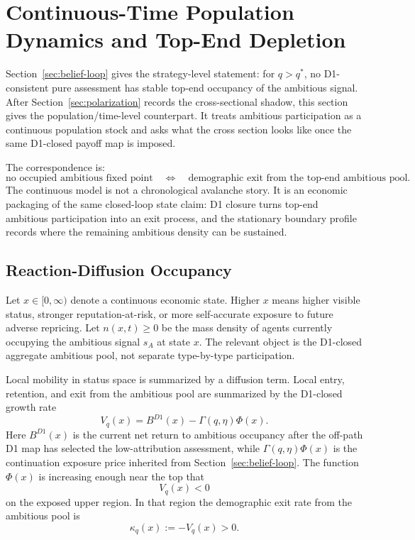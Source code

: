 
\section{Continuous-Time Population Dynamics and Top-End Depletion}
\label{sec:continuous-phase-transition}

Section~\ref{sec:belief-loop} gives the strategy-level statement: for \(q>q^*\), no D1-consistent pure assessment has stable top-end occupancy of the ambitious signal. After Section~\ref{sec:polarization} records the cross-sectional shadow, this section gives the population/time-level counterpart. It treats ambitious participation as a continuous population stock and asks what the cross section looks like once the same D1-closed payoff map is imposed.

The correspondence is:
\[
\text{no occupied ambitious fixed point}
\quad\Longleftrightarrow\quad
\text{demographic exit from the top-end ambitious pool}.
\]
The continuous model is not a chronological avalanche story. It is an economic packaging of the same closed-loop state claim: D1 closure turns top-end ambitious participation into an exit process, and the stationary boundary profile records where the remaining ambitious density can be sustained.

\subsection{Reaction-Diffusion Occupancy}

Let \(x\in[0,\infty)\) denote a continuous economic state. Higher \(x\) means higher visible status, stronger reputation-at-risk, or more self-accurate exposure to future adverse repricing. Let \(n(x,t)\ge0\) be the mass density of agents currently occupying the ambitious signal \(s_A\) at state \(x\). The relevant object is the D1-closed aggregate ambitious pool, not separate type-by-type participation.

Local mobility in status space is summarized by a diffusion term. Local entry, retention, and exit from the ambitious pool are summarized by the D1-closed growth rate
\[
V_q(x)=B^{D1}(x)-\Gamma(q,\eta)\Phi(x).
\]
Here \(B^{D1}(x)\) is the current net return to ambitious occupancy after the off-path D1 map has selected the low-attribution assessment, while \(\Gamma(q,\eta)\Phi(x)\) is the continuation exposure price inherited from Section~\ref{sec:belief-loop}. The function \(\Phi(x)\) is increasing enough near the top that
\[
V_q(x)<0
\]
on the exposed upper region. In that region the demographic exit rate from the ambitious pool is
\[
\kappa_q(x):=-V_q(x)>0.
\]

